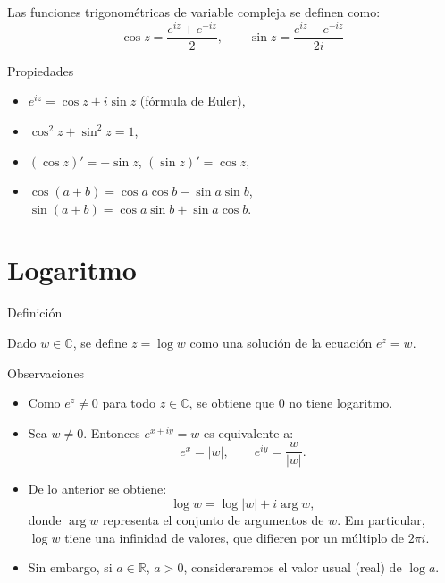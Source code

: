 \documentclass[spanish,presentation]{beamer}
\begin{document}
\begin{frame}[label=sec-2-1]{}
\begin{definition}
Las funciones trigonométricas de variable compleja se definen
como:
\begin{displaymath}
\cos z=\frac{e^{iz}+e^{-iz}}{2},\qquad \sin z=\frac{e^{iz}-e^{-iz}}{2i}
\end{displaymath}
\end{definition}

\begin{block}{Propiedades}
\begin{itemize}
\item \(e^{iz}=\cos z+i\sin z\) (fórmula de Euler),
\item \(\cos^{2} z+\sin^{2}z=1\),
\item \((\cos z)'=-\sin z\), \((\sin z)'=\cos z\),
\item \(\cos(a+b)=\cos a\cos b-\sin a\sin b\), \(\sin(a+b)=\cos a\sin
      b+\sin a\cos b\).
\end{itemize}
\end{block}
\end{frame}

\section{Logaritmo}
\label{sec-3}

\begin{frame}[label=sec-3-1]{Definición}
\begin{definition}[Logaritmo]
Dado \(w\in \mathbb{C}\), se define \(z=\log w\) como una solución
de la ecuación \(e^{z}=w\).
\end{definition}
\end{frame}

\begin{frame}[label=sec-3-2]{}
\begin{block}{Observaciones}
\begin{itemize}
\item Como \(e^{z}\ne 0\) para todo \(z\in \mathbb{C}\), se obtiene
que \(0\) no tiene logaritmo.
\item Sea \(w\ne 0\). Entonces \(e^{x+iy}=w\) es equivalente a:
\begin{displaymath}
e^{x}=|w|,\qquad e^{iy}=\frac{w}{|w|}.
\end{displaymath}
\item De lo anterior se obtiene:
\begin{displaymath}
\log w = \log |w| +i\arg w,
\end{displaymath}
donde \(\arg w\) representa el conjunto de argumentos de
\(w\). Em particular, \(\log w\) tiene una infinidad de valores,
que difieren por un múltiplo de \(2\pi i\).
\item Sin embargo, si \(a\in\mathbb{R}\), \(a>0\), consideraremos
el valor usual (real) de \(\log a\).
\end{itemize}
\end{block}
\end{frame}
\end{document}
